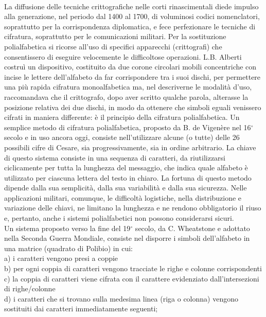\documentclass[a4paper,12pt]{tesiinfo}
\begin{document}
\\
La diffusione delle tecniche crittografiche nelle corti rinascimentali diede impulso alla generazione, nel periodo dal 1400 al 1700, di voluminosi codici nomenclatori, soprattutto per la corrispondenza diplomatica, e fece perfezionare le tecniche di cifratura, soprattutto per le comunicazioni militari. Per la sostituzione polialfabetica si ricorse all'uso di specifici apparecchi (crittografi) che consentissero di eseguire velocemente le difficoltose operazioni. L.B. Alberti costru\`i un dispositivo, costituito da due corone circolari mobili concentriche con incise le lettere dell'alfabeto da far corrispondere tra i suoi dischi, per permettere una pi\`u rapida cifratura monoalfabetica ma, nel descriverne le modalit\`a d'uso, raccomandava che il crittografo, dopo aver scritto qualche parola, alterasse la posizione relativa dei due dischi, in modo da ottenere che simboli eguali venissero cifrati in maniera differente: \`e il principio della cifratura polialfabetica.
Un semplice metodo di cifratura polialfabetica, proposto da B. de Vigen\`ere nel 16$^\circ$ secolo e in uso ancora oggi, consiste nell'utilizzare alcune (o tutte) delle 26 possibili cifre di Cesare, sia progressivamente, sia in ordine arbitrario. La chiave di questo sistema consiste in una sequenza di caratteri, da riutilizzarsi ciclicamente per tutta la lunghezza del messaggio, che indica quale alfabeto \`e utilizzato per ciascuna lettera del testo in chiaro. La fortuna di questo metodo dipende dalla sua semplicit\`a, dalla sua variabilit\`a e dalla sua sicurezza. Nelle applicazioni militari, comunque, le difficolt\`a logistiche, nella distribuzione e variazione delle chiavi, ne limitano la lunghezza e ne rendono obbligatorio il riuso e, pertanto, anche i sistemi polialfabetici non possono considerarsi sicuri.
\\
Un sistema proposto verso la fine del 19$^\circ$ secolo, da C. Wheatstone e adottato nella Seconda Guerra Mondiale, consiste nel disporre i simboli dell'alfabeto in una matrice (quadrato di Polibio) in cui:\\
a) i caratteri vengono presi a coppie\\
b) per ogni coppia di caratteri vengono tracciate le righe e colonne corrispondenti\\
c) la coppia di caratteri viene cifrata con il carattere evidenziato dall'intersezioni di righe/colonne\\
d) i caratteri che si trovano sulla medesima linea (riga o colonna) vengono sostituiti dai caratteri immediatamente seguenti;\\
\end{document}
